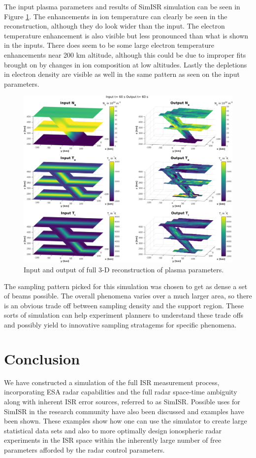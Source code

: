 \documentclass[draft,ras]{agutex}
\begin{document}
\begin{article}
The input plasma parameters and results of SimISR simulation can be seen in Figure \ref{fig:3dparams}. The enhancements in ion temperature can clearly be seen in the reconstruction, although they do look wider than the input. The electron temperature enhancement is also visible but less pronounced than what is shown in the inputs. There does seem to be some large electron temperature enhancements near 200 km altitude, although this could be due to improper fits brought on by changes in ion composition at low altitudes. Lastly the depletions in electron density are visible as well in the same pattern as seen on the input parameters.

\begin{figure}[!t]
\centering
\includegraphics[width=6in]{60_60}
\caption{Input and output of full 3-D reconstruction of plasma parameters.}
\label{fig:3dparams}
\end{figure}

The sampling pattern picked for this simulation was chosen to get as dense a set of beams possible. The overall phenomena varies over a much larger area, so there is an obvious trade off between sampling density and the support region. These sorts of simulation can help experiment planners to understand these trade offs and possibly yield to innovative sampling stratagems for specific phenomena. 
\section{Conclusion}
We have constructed a simulation of the full ISR measurement process, incorporating ESA radar capabilities and the full radar space-time ambiguity along with inherent ISR error sources, referred to as SimISR. Possible uses for SimISR in the research community have also been discussed and examples have been shown. These examples show how one can use the simulator to create large statistical data sets and also to more optimally design ionospheric radar experiments in the ISR space within the inherently large number of free parameters afforded by the radar control parameters. 


\end{article}
\end{document}
